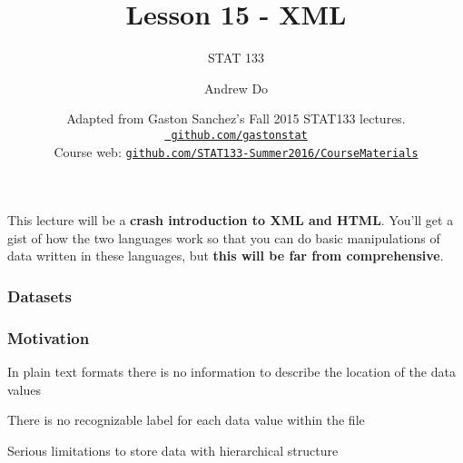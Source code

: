 \documentclass[12pt]{beamer}\usepackage[]{graphicx}\usepackage[]{color}
\title{Lesson 15 - XML}
\subtitle{STAT 133}
\author{Andrew Do}
\institute{Department of Statistics, UC{\textendash}Berkeley}
\date{\scriptsize \color{foreground} Adapted from Gaston Sanchez's Fall 2015 STAT133 lectures.
\\
\href{http://github.com/gastonstat}{\tt \scriptsize \color{foreground} github.com/gastonstat}
\\
{\scriptsize Course web: \href{https://github.com/STAT133-Summer2016/CourseMaterials}{\tt github.com/STAT133-Summer2016/CourseMaterials}}
}
\begin{document}
{
  \frame{
    \titlepage
  } 
}


\begin{frame}
\begin{center}
\end{center}
\end{frame}


\begin{frame}
\begin{center}

This lecture will be a \textbf{crash introduction to XML and HTML}.  You'll get a gist of how the two languages work so that you can do basic manipulations of data written in these languages, but \textbf{this will be far from comprehensive}.
\eb

\end{center}
\end{frame}


\begin{frame}
\frametitle{Datasets}

\eb
\begin{center}
\end{center}

\end{frame}


\begin{frame}

\end{frame}


\begin{frame}
\frametitle{Motivation}

\bbi
  \item In plain text formats there is no information to describe the location of the data values
  \item There is no recognizable label for each data value within the file
  \item Serious limitations to store data with hierarchical structure 
\ei
\eb

\end{frame}
\end{document}

